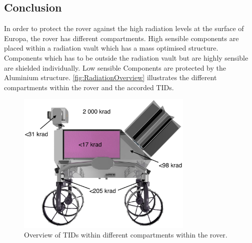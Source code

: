 \subsection{Conclusion}

\label{subsec:RadiationConclusion}

In order to protect the rover against the high radiation levels at the surface of Europa, the rover has different compartments. High sensible components are placed within a radiation vault which has a mass optimised structure. Components which has to be outside the radiation vault but are highly sensible are shielded individually. Low sensible Components are protected by the Aluminium structure. \autoref{fig:RadiationOverview} illustrates the different compartments within the rover and the accorded TIDs. \\

\begin{figure}[htb]
     \centering
     \includegraphics[width=0.75\textwidth]{Media/INSPIRE_Radiation}
     \caption{Overview of TIDs within different compartments within the rover.}
     \label{fig:RadiationOverview}
\end{figure}

\clearpage